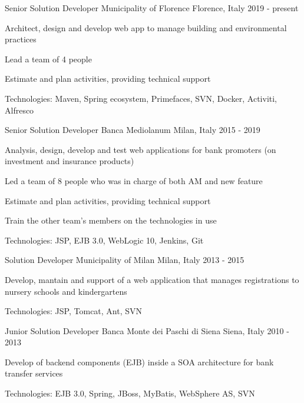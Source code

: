 \begin{cventries}
    \cventry
    {Senior Solution Developer}
    {Municipality of Florence}
    {Florence, Italy}
    {2019 - present}
    {
      \begin{cvitems}
        \item {Architect, design and develop web app to manage building and environmental practices}
        \item {Lead a team of 4 people}
        \item {Estimate and plan activities, providing technical support}
        \item {Technologies: Maven, Spring ecosystem, Primefaces, SVN, Docker, Activiti, Alfresco}
      \end{cvitems}
    }
    
    \cventry
    {Senior Solution Developer}
    {Banca Mediolanum}
    {Milan, Italy}
    {2015 - 2019}
    {
      \begin{cvitems}
        \item {Analysis, design, develop and test web applications for bank promoters (on investment and insurance products) }
        \item {Led a team of 8 people who was in charge of both AM and new feature}
        \item {Estimate and plan activities, providing technical support}
        \item {Train the other team's members on the technologies in use}
        \item {Technologies: JSP, EJB 3.0, WebLogic 10, Jenkins, Git}
      \end{cvitems}
    }
    
    \cventry
    {Solution Developer}
    {Municipality of Milan}
    {Milan, Italy}
    {2013 - 2015}
    {
      \begin{cvitems}
        \item {Develop, mantain and support of a web application that manages registrations to nursery schools and kindergartens}
        \item {Technologies: JSP, Tomcat, Ant, SVN}
      \end{cvitems}
    }
  
    \cventry
    {Junior Solution Developer}
    {Banca Monte dei Paschi di Siena}
    {Siena, Italy}
    {2010 - 2013}
    {
      \begin{cvitems}
        \item {Develop of backend components (EJB) inside a SOA architecture for bank transfer services}
        \item {Technologies: EJB 3.0, Spring, JBoss, MyBatis, WebSphere AS, SVN}
      \end{cvitems} 
    }
\end{cventries}
